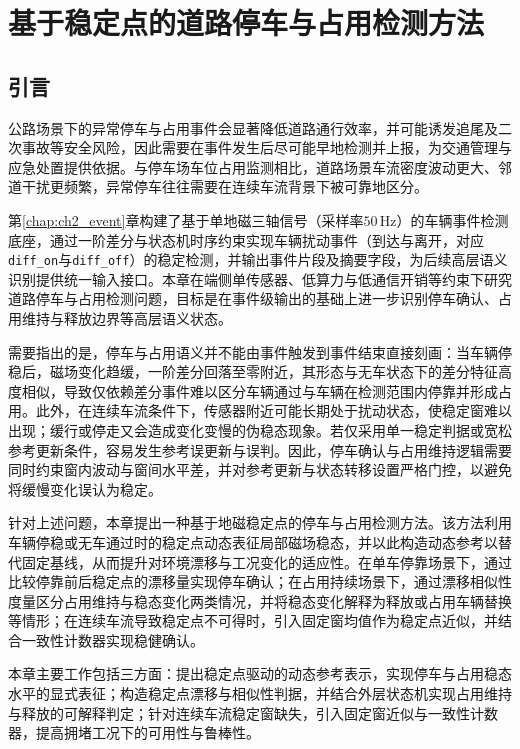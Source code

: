 \chapter{基于稳定点的道路停车与占用检测方法}
\label{chap:ch4_parking}

\section{引言}
\label{sec:ch4_intro}

公路场景下的异常停车与占用事件会显著降低道路通行效率，并可能诱发追尾及二次事故等安全风险，因此需要在事件发生后尽可能早地检测并上报，为交通管理与应急处置提供依据。与停车场车位占用监测相比，道路场景车流密度波动更大、邻道干扰更频繁，异常停车往往需要在连续车流背景下被可靠地区分。

第\ref{chap:ch2_event}章构建了基于单地磁三轴信号（采样率$50\,\mathrm{Hz}$）的车辆事件检测底座，通过一阶差分与状态机时序约束实现车辆扰动事件（到达与离开，对应\texttt{diff\_on}与\texttt{diff\_off}）的稳定检测，并输出事件片段及摘要字段，为后续高层语义识别提供统一输入接口。本章在端侧单传感器、低算力与低通信开销等约束下研究道路停车与占用检测问题，目标是在事件级输出的基础上进一步识别停车确认、占用维持与释放边界等高层语义状态。

需要指出的是，停车与占用语义并不能由事件触发到事件结束直接刻画：当车辆停稳后，磁场变化趋缓，一阶差分回落至零附近，其形态与无车状态下的差分特征高度相似，导致仅依赖差分事件难以区分车辆通过与车辆在检测范围内停靠并形成占用。此外，在连续车流条件下，传感器附近可能长期处于扰动状态，使稳定窗难以出现；缓行或停走又会造成变化变慢的伪稳态现象。若仅采用单一稳定判据或宽松参考更新条件，容易发生参考误更新与误判。因此，停车确认与占用维持逻辑需要同时约束窗内波动与窗间水平差，并对参考更新与状态转移设置严格门控，以避免将缓慢变化误认为稳定。

针对上述问题，本章提出一种基于地磁稳定点的停车与占用检测方法。该方法利用车辆停稳或无车通过时的稳定点动态表征局部磁场稳态，并以此构造动态参考以替代固定基线，从而提升对环境漂移与工况变化的适应性。在单车停靠场景下，通过比较停靠前后稳定点的漂移量实现停车确认；在占用持续场景下，通过漂移相似性度量区分占用维持与稳态变化两类情况，并将稳态变化解释为释放或占用车辆替换等情形；在连续车流导致稳定点不可得时，引入固定窗均值作为稳定点近似，并结合一致性计数器实现稳健确认。

本章主要工作包括三方面：提出稳定点驱动的动态参考表示，实现停车与占用稳态水平的显式表征；构造稳定点漂移与相似性判据，并结合外层状态机实现占用维持与释放的可解释判定；针对连续车流稳定窗缺失，引入固定窗近似与一致性计数器，提高拥堵工况下的可用性与鲁棒性。

